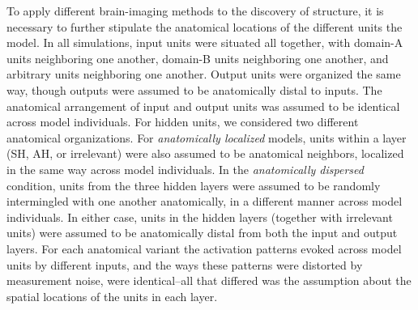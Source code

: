 To apply different brain-imaging methods to the discovery of structure, it is necessary to further stipulate the anatomical locations of the different units the model. In all simulations, input units were situated all together, with domain-A units neighboring one another, domain-B units neighboring one another, and arbitrary units neighboring one another. Output units were organized the same way, though outputs were assumed to be anatomically distal to inputs. The anatomical arrangement of input and output units was assumed to be identical across model individuals. For hidden units, we considered two different anatomical organizations. For {\em anatomically localized} models, units within a layer (SH, AH, or irrelevant) were also assumed to be anatomical neighbors, localized in the same way across model individuals. In the {\em anatomically dispersed} condition, units from the three hidden layers were assumed to be randomly intermingled with one another anatomically, in a different manner across model individuals. In either case, units in the hidden layers (together with irrelevant units) were assumed to be anatomically distal from both the input and output layers. For each anatomical variant the activation patterns evoked across model units by different inputs, and the ways these patterns were distorted by measurement noise, were identical--all that differed was the assumption about the spatial locations of the units in each layer.


